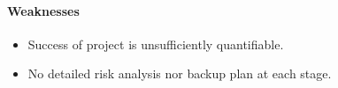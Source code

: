 \paragraph{Weaknesses}
\begin{itemize}
    \item Success of project is unsufficiently quantifiable.
    \item No detailed risk analysis nor backup plan at each stage.
\end{itemize}
